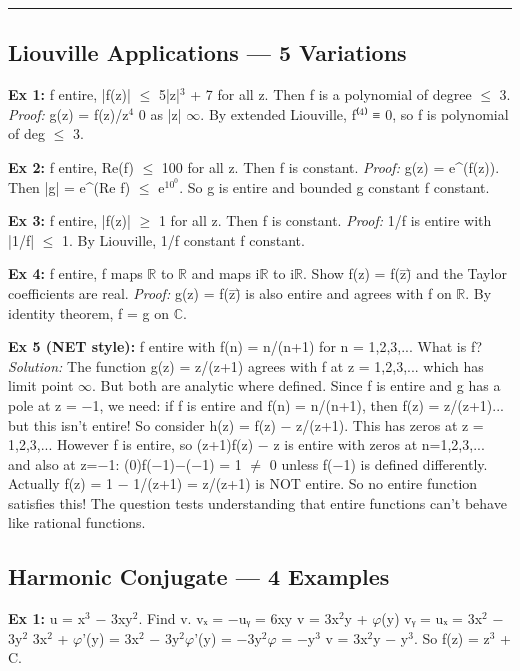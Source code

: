 \documentclass[12pt,a4paper,openany]{book}
\begin{document}
{{\bigskip\noindent\rule{\textwidth}{0.4pt}\bigskip


\subsection{Liouville Applications — 5 Variations}

\textbf{Ex 1:} f entire, |f(z)| $\leq$ 5|z|$^3$ + 7 for all z. Then f is a polynomial of degree $\leq$ 3.
\textit{Proof:} g(z) = f(z)/z$^4$  0 as |z|  $\infty$. By extended Liouville, f⁽$^4$⁾ ≡ 0, so f is polynomial of deg $\leq$ 3.

\textbf{Ex 2:} f entire, Re(f) $\leq$ 100 for all z. Then f is constant.
\textit{Proof:} g(z) = e^(f(z)). Then |g| = e^(Re f) $\leq$ e$^{10}^0$. So g is entire and bounded  g constant  f constant.

\textbf{Ex 3:} f entire, |f(z)| $\geq$ 1 for all z. Then f is constant.
\textit{Proof:} 1/f is entire with |1/f| $\leq$ 1. By Liouville, 1/f constant  f constant.

\textbf{Ex 4:} f entire, f maps $\mathbb{R}$ to $\mathbb{R}$ and maps i$\mathbb{R}$ to i$\mathbb{R}$. Show f(z) = f(z̄)̄ and the Taylor coefficients are real.
\textit{Proof:} g(z) = f(z̄)̄ is also entire and agrees with f on $\mathbb{R}$. By identity theorem, f = g on $\mathbb{C}$.

\textbf{Ex 5 (NET style):} f entire with f(n) = n/(n+1) for n = 1,2,3,... What is f?
\textit{Solution:} The function g(z) = z/(z+1) agrees with f at z = 1,2,3,... which has limit point $\infty$. But both are analytic where defined. Since f is entire and g has a pole at z = −1, we need: if f is entire and f(n) = n/(n+1), then f(z) = z/(z+1)... but this isn't entire! So consider h(z) = f(z) − z/(z+1). This has zeros at z = 1,2,3,... However f is entire, so (z+1)f(z) − z is entire with zeros at n=1,2,3,... and also at z=−1: (0)f(−1)−(−1) = 1 $\neq$ 0 unless f(−1) is defined differently. Actually f(z) = 1 − 1/(z+1) = z/(z+1) is NOT entire. So no entire function satisfies this! The question tests understanding that entire functions can't behave like rational functions.

\subsection{Harmonic Conjugate — 4 Examples}

\textbf{Ex 1:} u = x$^3$ − 3xy$^2$. Find v.
vₓ = −uᵧ = 6xy  v = 3x$^2$y + $\varphi$(y)
vᵧ = uₓ = 3x$^2$ − 3y$^2$  3x$^2$ + $\varphi$'(y) = 3x$^2$ − 3y$^2\varphi$'(y) = −3y$^2\varphi$ = −y$^3$
v = 3x$^2$y − y$^3$. So f(z) = z$^3$ + C. 

}}
\end{document}
